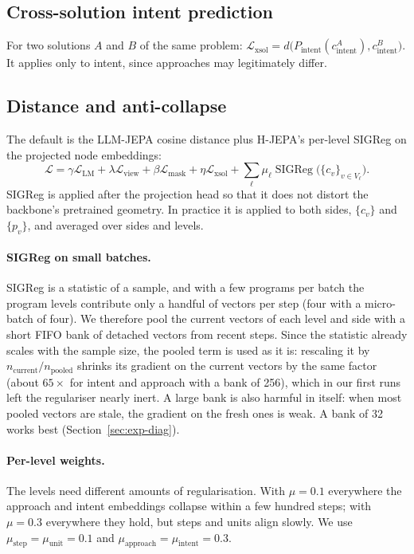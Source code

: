 \documentclass[11pt]{article}
\newcommand{\Lcal}{\mathcal{L}}
\newcommand{\SIGReg}{\operatorname{SIGReg}}
\begin{document}
\subsection{Cross-solution intent prediction}
\label{sec:loss-xsol}
For two solutions $A$ and $B$ of the same problem:
$\Lcal_{\text{xsol}} = d\bigl(P_{\text{intent}}(c^{A}_{\text{intent}}), c^{B}_{\text{intent}}\bigr)$.
It applies only to intent, since approaches may legitimately differ.

\subsection{Distance and anti-collapse}
\label{sec:loss-dist}
The default is the LLM-JEPA cosine distance plus H-JEPA's per-level SIGReg on the projected node embeddings:
\begin{equation}
\Lcal = \gamma\Lcal_{\text{LM}} + \lambda\Lcal_{\text{view}} + \beta\Lcal_{\text{mask}} + \eta\Lcal_{\text{xsol}}
 + \sum_\ell \mu_\ell \SIGReg\bigl(\{c_v\}_{v\in V_\ell}\bigr).
\end{equation}
SIGReg is applied after the projection head so that it does not distort the backbone's pretrained geometry. In
practice it is applied to both sides, $\{c_v\}$ and $\{p_v\}$, and averaged over sides and levels.

\paragraph{SIGReg on small batches.} SIGReg is a statistic of a sample, and with a few programs per batch the program
levels contribute only a handful of vectors per step (four with a micro-batch of four). We therefore pool the current
vectors of each level and side with a short FIFO bank of detached vectors from recent steps. Since the statistic
already scales with the sample size, the pooled term is used as it is: rescaling it by
$n_{\text{current}}/n_{\text{pooled}}$ shrinks its gradient on the current vectors by the same factor (about
$65\times$ for intent and approach with a bank of 256), which in our first runs left the regulariser nearly inert.
A large bank is also harmful in itself: when most pooled vectors are stale, the gradient on the fresh ones is weak.
A bank of 32 works best (Section~\ref{sec:exp-diag}).

\paragraph{Per-level weights.} The levels need different amounts of regularisation. With $\mu=0.1$ everywhere the
approach and intent embeddings collapse within a few hundred steps; with $\mu=0.3$ everywhere they hold, but steps
and units align slowly. We use $\mu_{\text{step}}=\mu_{\text{unit}}=0.1$ and
$\mu_{\text{approach}}=\mu_{\text{intent}}=0.3$.
\end{document}
